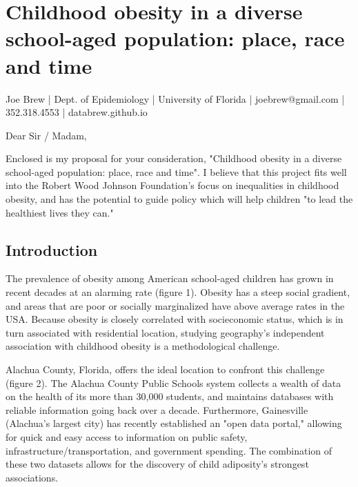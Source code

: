 \documentclass[11pt]{article}
\begin{document}


\fancyhfoffset[E,O]{0pt}

\section*{Childhood obesity in a diverse school-aged population: place, race and time}
Joe Brew | Dept. of Epidemiology | University of Florida | joebrew@gmail.com | 352.318.4553 | databrew.github.io

\noindent \hrulefill

\vspace{5mm}
\noindent Dear Sir / Madam,

Enclosed is my proposal for your consideration, "Childhood obesity in a diverse school-aged population: place, race and time".  I believe that this project fits well into the Robert Wood Johnson Foundation's focus on inequalities in childhood obesity, and has the potential to guide policy which will help children "to lead the healthiest lives they can."  


\subsection*{Introduction}
The prevalence of obesity among American school-aged children has grown in recent decades at an alarming rate (figure 1). \cite{Ogden2014} Obesity has a steep social gradient, and areas that are poor or socially marginalized have above average rates in the USA. \cite{Budd2014} Because obesity is closely correlated with socieconomic status, which is in turn associated with residential location, studying geography's independent association with childhood obesity is a methodological challenge. 

Alachua County, Florida, offers the ideal location to confront this challenge (figure 2).  The Alachua County Public Schools system \cite{acps} collects a wealth of data on the health of its more than 30,000 students, and maintains databases with reliable information going back over a decade.  Furthermore, Gainesville (Alachua's largest city) has recently established an "open data portal," allowing for quick and easy access to information on public safety, infrastructure/transportation, and government spending. \cite{gnv}  The combination of these two datasets allows for the discovery of child adiposity's strongest associations.
\end{document}
